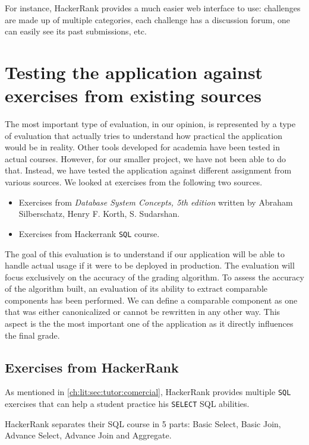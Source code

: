 For instance, HackerRank provides a much easier web interface to use: challenges are made up of multiple categories, each challenge has a discussion forum, one can easily see its past submissions, etc.

\section{Testing the application against exercises from existing sources}
The most important type of evaluation, in our opinion, is represented by a type of evaluation that actually tries to understand how practical the application would be in reality. Other tools developed for academia have been tested in actual courses. However, for our smaller project, we have not been able to do that. Instead, we have tested the application against different assignment from various sources. We looked at exercises from the following two sources.

\begin{itemize}
    \item Exercises from \textit{Database System Concepts, 5th edition} written by Abraham Silberschatz, Henry F. Korth, S. Sudarshan.
    \item Exercises from Hackerrank \texttt{SQL} course.
\end{itemize}

The goal of this evaluation is to understand if our application will be able to handle actual usage if it were to be deployed in production. The evaluation will focus exclusively on the accuracy of the grading algorithm. To assess the accuracy of the algorithm built, an evaluation of its ability to extract comparable components has been performed. We can define  a comparable component as one that was either canonicalized or cannot be rewritten in any other way. This aspect is the the most important one of the application as it directly influences the final grade.

\subsection{Exercises from HackerRank}

As mentioned in \ref{ch:lit:sec:tutor:comercial}, HackerRank provides multiple \texttt{SQL} exercises that can help a student practice his \texttt{SELECT} SQL abilities.

HackerRank separates their SQL course in 5 parts: Basic Select, Basic Join, Advance Select, Advance Join and Aggregate.

